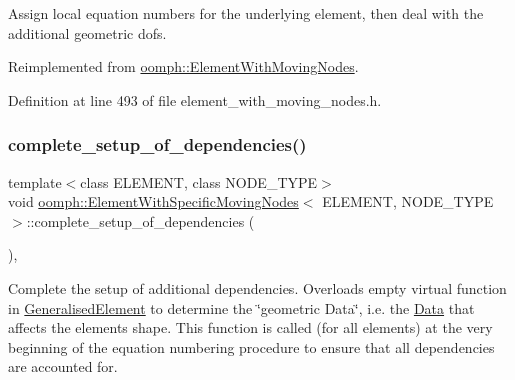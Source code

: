 Assign local equation numbers for the underlying element, then deal with the additional geometric dofs. 



Reimplemented from \hyperlink{classoomph_1_1ElementWithMovingNodes_a5fdaf955e508b80e5fd5673f574472d5}{oomph\+::\+Element\+With\+Moving\+Nodes}.



Definition at line 493 of file element\+\_\+with\+\_\+moving\+\_\+nodes.\+h.

\mbox{\label{classoomph_1_1ElementWithSpecificMovingNodes_ae54ee1d8772757d72d9df3e7229d8ecf}} 
\subsubsection{\texorpdfstring{complete\+\_\+setup\+\_\+of\+\_\+dependencies()}{complete\_setup\_of\_dependencies()}}
{\footnotesize\ttfamily template$<$class E\+L\+E\+M\+E\+NT, class N\+O\+D\+E\+\_\+\+T\+Y\+PE$>$ \\
void \hyperlink{classoomph_1_1ElementWithSpecificMovingNodes}{oomph\+::\+Element\+With\+Specific\+Moving\+Nodes}$<$ E\+L\+E\+M\+E\+NT, N\+O\+D\+E\+\_\+\+T\+Y\+PE $>$\+::complete\+\_\+setup\+\_\+of\+\_\+dependencies (\begin{DoxyParamCaption}{ }\end{DoxyParamCaption})\hspace{0.3cm}{\ttfamily [inline]}, {\ttfamily [virtual]}}



Complete the setup of additional dependencies. Overloads empty virtual function in \hyperlink{classoomph_1_1GeneralisedElement}{Generalised\+Element} to determine the \char`\"{}geometric
\+Data\char`\"{}, i.\+e. the \hyperlink{classoomph_1_1Data}{Data} that affects the element\textquotesingle{}s shape. This function is called (for all elements) at the very beginning of the equation numbering procedure to ensure that all dependencies are accounted for. 



